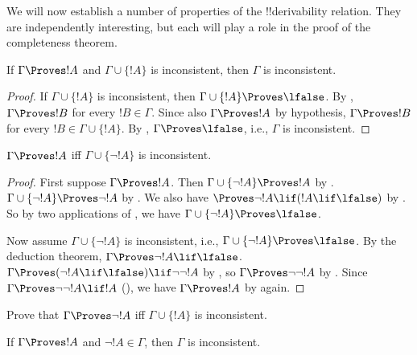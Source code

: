 We will now establish a number of properties of the !!{derivability}
relation.  They are independently interesting, but each will play a
role in the proof of the completeness theorem.

\begin{prop}
  If $\Gamma \Proves !A$ and $\Gamma \cup \{!A\}$ is inconsistent,
  then $\Gamma$ is inconsistent.
\end{prop}

\begin{proof}
  If $\Gamma \cup \{!A\}$ is inconsistent, then $\Gamma \cup \{!A\}
  \Proves \lfalse$. By , $\Gamma \Proves
  !B$ for every $!B \in \Gamma$. Since also $\Gamma \Proves !A$ by
  hypothesis, $\Gamma \Proves !B$ for every $!B \in \Gamma \cup
  \{!A\}$. By , $\Gamma \Proves
  \lfalse$, i.e., $\Gamma$ is inconsistent.
\end{proof}

\begin{prop}
$\Gamma \Proves !A$ iff $\Gamma \cup \{\lnot !A\}$ is inconsistent.
\end{prop}

\begin{proof}
First suppose $\Gamma \Proves !A$. Then $\Gamma \cup \{\lnot !A\}
\Proves !A$ by . $\Gamma \cup \{\lnot
!A\} \Proves \lnot !A$ by .  We also have
$\Proves \lnot !A \lif (!A \lif \lfalse)$ by . So
by two applications of , we have $\Gamma \cup \{\lnot
!A\} \Proves \lfalse$.

Now assume $\Gamma \cup \{\lnot !A\}$ is inconsistent, i.e., $\Gamma
\cup \{\lnot !A\} \Proves \lfalse$. By the deduction theorem, $\Gamma
\Proves \lnot !A \lif \lfalse$. $\Gamma \Proves (\lnot !A \lif
\lfalse) \lif \lnot\lnot !A$ by , so $\Gamma
\Proves \lnot\lnot !A$ by . Since $\Gamma \Proves
\lnot\lnot !A \lif !A$ (), we have $\Gamma
\Proves !A$ by  again.
\end{proof}

\begin{prob}
Prove that $\Gamma \Proves \lnot !A$ iff $\Gamma \cup \{!A\}$ is
inconsistent.
\end{prob}

\begin{prop}
  If $\Gamma \Proves !A$ and $\lnot !A \in \Gamma$, then $\Gamma$ is
  inconsistent.
\end{prop}

